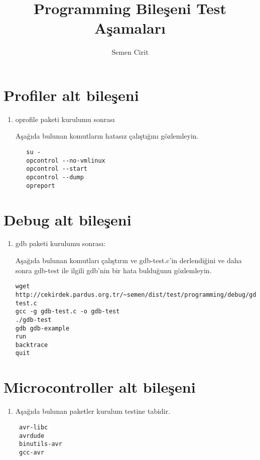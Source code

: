 \documentclass[a4paper,10pt]{article}
\title{Programming Bileşeni Test Aşamaları}
\author{Semen Cirit}
\begin{document}
\maketitle
\section{Profiler alt bileşeni}
\begin{enumerate}
 \item oprofile paketi kurulumu sonrası

Aşağıda bulunan komutların hatasız çalıştığını gözlemleyin.
  \begin{verbatim}
   su -
   opcontrol --no-vmlinux
   opcontrol --start
   opcontrol --dump
   opreport
  \end{verbatim}

\end{enumerate}

\section{Debug alt bileşeni}
\begin{enumerate}
 \item gdb paketi kurulumu sonrası:

Aşağıda bulunan komutları çalıştırın ve gdb-test.c'in derlendiğini ve daha sonra gdb-test ile ilgili gdb'nin bir hata bulduğunu gözlemleyin.
\begin{verbatim}
wget http://cekirdek.pardus.org.tr/~semen/dist/test/programming/debug/gdb-test.c
gcc -g gdb-test.c -o gdb-test
./gdb-test
gdb gdb-example
run
backtrace
quit
\end{verbatim}


\end{enumerate}


\section{Microcontroller alt bileşeni}
\begin{enumerate}
 \item Aşağıda bulunan paketler kurulum testine tabidir.
\begin{verbatim}
 avr-libc
 avrdude
 binutils-avr
 gcc-avr
\end{verbatim}

\end{enumerate}
\end{document}
